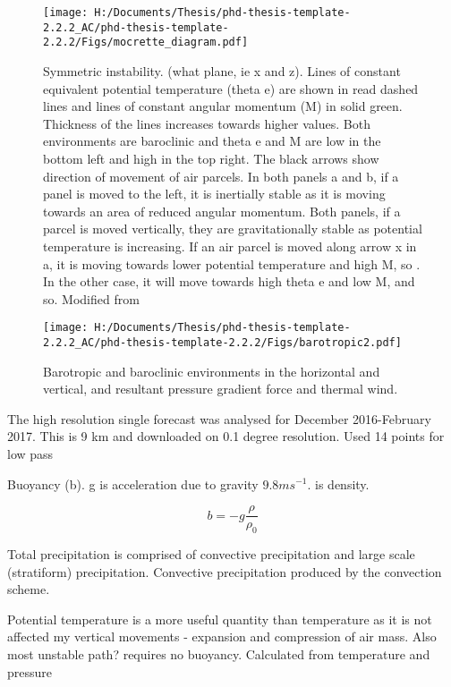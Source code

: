 \begin{figure}
	
	\texttt{[image: H:/Documents/Thesis/phd-thesis-template-2.2.2\_AC/phd-thesis-template-2.2.2/Figs/mocrette\_diagram.pdf]}
	\caption{Symmetric instability. (what plane, ie x and z). Lines of constant equivalent potential temperature (theta e)  are shown in read dashed lines and lines of constant angular momentum (M) in solid green. Thickness of the lines increases towards  higher values. Both environments are baroclinic and theta e and M are low in the bottom left and high in the top right. The black arrows show direction of movement of air parcels. In both panels a and b, if a panel is moved to the left, it is inertially stable as it is moving towards an area of reduced angular momentum. Both panels, if a parcel is moved vertically, they are gravitationally stable as potential temperature is increasing. If an air parcel is moved along arrow x in a, it is moving towards lower potential temperature and high M, so . In the other case, it will move towards high theta e and low M, and so. Modified from \cite{morcrette2004radar}}\label{fig:symm_inst}
	\centering
\end{figure}


\begin{figure}
	
	\texttt{[image: H:/Documents/Thesis/phd-thesis-template-2.2.2\_AC/phd-thesis-template-2.2.2/Figs/barotropic2.pdf]}
	\caption{Barotropic and baroclinic environments in the horizontal and vertical, and resultant pressure gradient force and thermal wind.}\label{fig:barotropic}
	\centering
\end{figure}

The high resolution single forecast was analysed for December 2016-February 2017. This is 9 km and downloaded on 0.1 degree resolution. Used 14 points for low pass

Buoyancy (b). g is acceleration due to gravity \(9.8ms^{-1}\). {\rho} is density.

\begin{equation} \label{eq_b}
b = -g\frac{\rho}{\rho_0}
\end{equation}

Total precipitation is comprised of convective precipitation and large scale (stratiform) precipitation. Convective precipitation produced by the convection scheme. 

Potential temperature is a more useful quantity than temperature as it is not affected my vertical movements - expansion and compression of air mass. Also most unstable path? requires no buoyancy. Calculated from temperature and pressure


